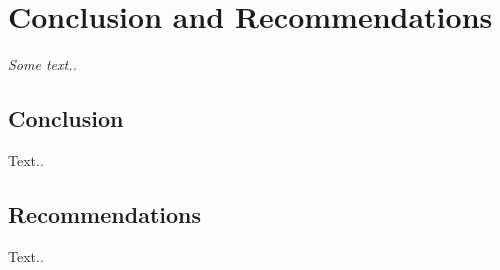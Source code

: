\setlength{\footskip}{8mm}

\chapter{Conclusion and Recommendations}
\label{ch:conclusion}

\textit{Some text..}

\section{Conclusion}

Text..

\section{Recommendations}

Text..

\FloatBarrier

